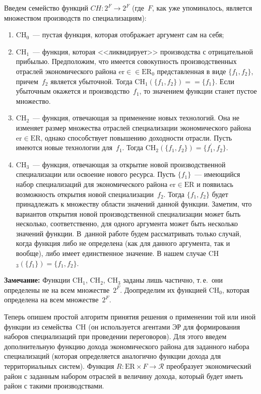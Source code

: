 \begin{multicols}{2}
  Введем семейство функций $CH: 2^F\rightarrow 2^F$ (где~$F$, как уже 
упоминалось, является множеством производств по специализациям):
  \begin{enumerate}[1)]
\item CH$_0$~--- пустая функция, которая отображает аргумент сам на себя;
\item CH$_1$~--- функция, которая <<ликвидирует>> производства с 
отрицательной прибылью.
Предположим, что имеется совокупность про\-извод\-ственных отраслей 
экономического \mbox{района} $\mathrm{er}\in$\linebreak $\in  \mathrm{ER}_0$ представленная в виде $\{f_1,f_2\}$, 
причем~$f_2$ является убыточной. Тогда CH$_1(\{f_1,f_2\})=$\linebreak $=\{f_1\}$. Если 
убыточным окажется и производство~$f_1$, то значением функции станет 
пустое множество.
\item CH$_2$~--- функция, отвечающая за применение новых технологий. Она не 
изменяет размер множества отраслей специализации экономического района 
$\mathrm{er}\in \mathrm{ER}$, однако способствует повышению доходности отрасли. Пусть 
имеются новые технологии для~$f_1$. Тогда 
CH$_2(\{f_1,f_2\})=\{f_1^\prime,f_2\}$.
\item CH$_3$~--- функция, отвечающая за открытие новой производственной 
специализации или освоение нового ресурса. Пусть $\{f_1\}$~--- имеющийся 
набор специализаций для экономического района $\mathrm{er}\in \mathrm{ER}$ и появилась 
возможность открытия новой специализации~$f_2$. Тогда $\{f_1,f_2\}$ будет 
принадлежать к множеству об\-ласти значений данной функции. Заметим, что 
вариантов открытия новой производственной специализации может быть 
несколько, соответственно, для одного аргумента может быть несколько 
значений функции. В~данной работе будем рассматривать только случай, когда 
функция либо не определена (как для данного аргумента, так и вообще), либо 
имеет единственное значение. В нашем случае CH$_3(\{f_1\})=\{f_1,f_2\}$.
\end{enumerate}


\noindent
\textbf{Замечание:} Функции CH$_1$, CH$_2$, CH$_3$ заданы лишь частично, 
т.\,е.\ они определены не на всем множестве~$2^F$. Доопределим их функцией 
CH$_0$, которая определена на всем множестве~$2^F$. 
  
  \smallskip
  
  Теперь опишем простой алгоритм принятия решения о применении той или 
иной функции из семейства~CH (он используется агентами ЭР для 
формирования наборов специализаций при проведении переговоров). Для этого 
введем дополнительную функцию дохода экономического района для 
заданного набора специализаций (которая определяется аналогично функции 
дохода для территориальных систем).
  Функция $R: \mathrm{ER}\times F\rightarrow \mathcal{R}$ преобразует экономический 
район с заданным набором отраслей в величину дохода, который будет иметь 
район с такими производствами.


\end{multicols}
